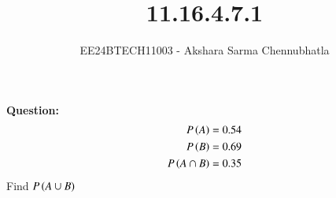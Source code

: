 \documentclass[journal]{IEEEtran}
\begin{document}

\vspace{3cm}

\title{11.16.4.7.1}
\author{EE24BTECH11003 - Akshara Sarma Chennubhatla}
{\let\newpage\relax\maketitle}
\textbf{Question:\\}
\begin{align}
	P\left(A\right) &= 0.54\\
	P\left(B\right) &= 0.69\\
	P\left(A \cap B\right) &= 0.35
\end{align}
Find $P\left(A \cup B\right)$\\

\solution\\
\end{document}
